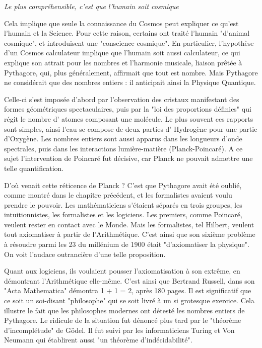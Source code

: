 \documentclass[a4paper,12pt]{article}
\begin{document}
\textit {Le plus compréhensible, c'est que l'humain soit cosmique}

Cela implique que seule la connaissance du Cosmos peut expliquer ce qu'est l'humain et la Science. Pour cette raison, certains ont traité l'humain "d'animal cosmique", et introduisent une "conscience cosmique". En particulier, l'hypothèse d'un Cosmos calculateur implique que l'humain soit aussi calculateur, ce qui explique son attrait pour les nombres et l'harmonie musicale, liaison prêtée à Pythagore, qui, plus généralement, affirmait que tout est nombre. Mais Pythagore ne considérait que des nombres entiers : il anticipait ainsi la Physique Quantique.  

Celle-ci s'est imposée d'abord par l'observation des cristaux manifestant des formes géométriques spectaculaires, puis par la "loi des proportions définies" qui régit le nombre d' atomes composant une molécule. Le plus souvent ces rapports sont simples, ainsi l'eau se compose de deux parties d' Hydrogène pour une partie d'Oxygène. Les nombres entiers sont aussi apparus dans les longueurs d'onde spectrales, puis dans les interactions lumière-matière (Planck-Poincaré). A ce sujet l'intervention de Poincaré fut décisive, car Planck ne pouvait admettre une telle quantification.

D'où venait cette réticence de Planck ? C'est que Pythagore avait été oublié, comme montré dans le chapitre précédent, et les formalistes avaient voulu prendre le pouvoir. Les mathématiciens s'étaient séparés en trois groupes, les intuitionnistes, les formalistes et les logiciens. Les premiers, comme Poincaré, veulent rester en contact avec le Monde. Mais les formalistes, tel Hilbert, veulent tout axiomatiser à partir de l'Arithmétique. C'est ainsi que son sixième problème à résoudre parmi les 23 du millénium de 1900 était "d'axiomatiser la physique". On voit l'audace outrancière d'une telle proposition. 

Quant aux logiciens, ils voulaient pousser l'axiomatisation à son extrême, en démontrant l'Arithmétique elle-même. C'est ainsi que Bertrand Russell, dans son "Acta Mathematica" démontra 1 + 1 = 2, après 180 pages. Il est significatif que ce soit un soi-disant "philosophe" qui se soit livré à un si grotesque exercice. Cela illustre le fait que les philosophes modernes ont détesté les nombres entiers de Pythagore. Le ridicule de la situation fut dénoncé plus tard par le "théorème d'incomplétude" de Gödel. Il fut suivi par les informaticiens Turing et Von Neumann qui établirent aussi "un théorème d'indécidabilité". 
\end{document}
